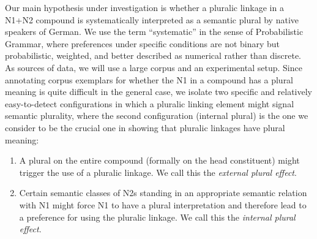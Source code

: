 Our main hypothesis under investigation is whether a pluralic linkage in a N1+N2 compound is systematically interpreted as a semantic plural by native speakers of German.
We use the term ``systematic'' in the sense of Probabilistic Grammar, where preferences under specific conditions are not binary but probabilistic, weighted, and better described as numerical rather than discrete.
As sources of data, we will use a large corpus and an experimental setup.
Since annotating corpus exemplars for whether the N1 in a compound has a plural meaning is quite difficult in the general case, we isolate two specific and relatively easy-to-detect configurations in which a pluralic linking element might signal semantic plurality, where the second configuration (internal plural) is the one we consider to be the crucial one in showing that pluralic linkages have plural meaning:

\vspace{\baselineskip}

\begin{enumerate}
  \item A plural on the entire compound (formally on the head constituent) might trigger the use of a pluralic linkage.
  We call this the \textit{external plural effect}.
  \item Certain semantic classes of N2s standing in an appropriate semantic relation with N1 might force N1 to have a plural interpretation and therefore lead to a preference for using the pluralic linkage.
  We call this the \textit{internal plural effect}.
\end{enumerate}

\vspace{\baselineskip}

